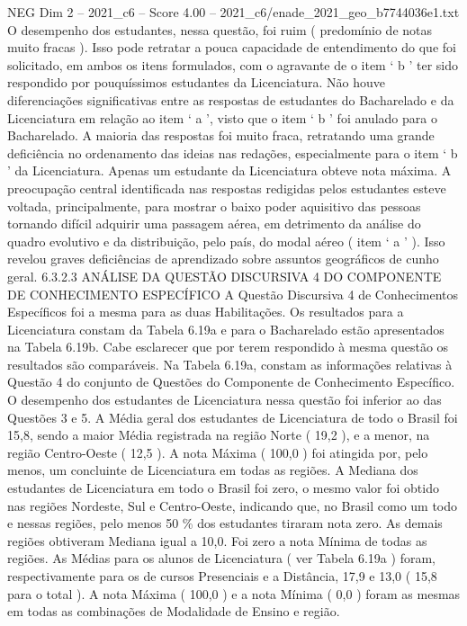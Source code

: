 \begin{textsample}{NEG Dim 2 – 2021\_c6 – Score 4.00 – 2021\_c6/enade\_2021\_geo\_b7744036e1.txt}
O desempenho dos estudantes, nessa questão, foi ruim ( predomínio de notas muito fracas ).
Isso pode retratar a pouca capacidade de entendimento do que foi solicitado, em ambos os itens formulados, com o agravante de o item ‘ b ’ ter sido respondido por pouquíssimos estudantes da Licenciatura.
Não houve diferenciações significativas entre as respostas de estudantes do Bacharelado e da Licenciatura em relação ao item ‘ a ’, visto que o item ‘ b ’ foi anulado para o Bacharelado.
A maioria das respostas foi muito fraca, retratando uma grande deficiência no ordenamento das ideias nas redações, especialmente para o item ‘ b ’ da Licenciatura.
Apenas um estudante da Licenciatura obteve nota máxima.
A preocupação central identificada nas respostas redigidas pelos estudantes esteve voltada, principalmente, para mostrar o baixo poder aquisitivo das pessoas tornando difícil adquirir uma passagem aérea, em detrimento da análise do quadro evolutivo e da distribuição, pelo país, do modal aéreo ( item ‘ a ’ ).
Isso revelou graves deficiências de aprendizado sobre assuntos geográficos de cunho geral. 6.3.2.3 ANÁLISE DA QUESTÃO DISCURSIVA 4 DO COMPONENTE DE CONHECIMENTO ESPECÍFICO A Questão Discursiva 4 de Conhecimentos Específicos foi a mesma para as duas Habilitações.
Os resultados para a Licenciatura constam da Tabela 6.19a e para o Bacharelado estão apresentados na Tabela 6.19b.
Cabe esclarecer que por terem respondido à mesma questão os resultados são comparáveis.
Na Tabela 6.19a, constam as informações relativas à Questão 4 do conjunto de Questões do Componente de Conhecimento Específico.
O desempenho dos estudantes de Licenciatura nessa questão foi inferior ao das Questões 3 e 5.
A Média geral dos estudantes de Licenciatura de todo o Brasil foi 15,8, sendo a maior Média registrada na região Norte ( 19,2 ), e a menor, na região Centro-Oeste ( 12,5 ).
A nota Máxima ( 100,0 ) foi atingida por, pelo menos, um concluinte de Licenciatura em todas as regiões.
A Mediana dos estudantes de Licenciatura em todo o Brasil foi zero, o mesmo valor foi obtido nas regiões Nordeste, Sul e Centro-Oeste, indicando que, no Brasil como um todo e nessas regiões, pelo menos 50 \% dos estudantes tiraram nota zero.
As demais regiões obtiveram Mediana igual a 10,0.
Foi zero a nota Mínima de todas as regiões.
As Médias para os alunos de Licenciatura ( ver Tabela 6.19a ) foram, respectivamente para os de cursos Presenciais e a Distância, 17,9 e 13,0 ( 15,8 para o total ).
A nota Máxima ( 100,0 ) e a nota Mínima ( 0,0 ) foram as mesmas em todas as combinações de Modalidade de Ensino e região.

\end{textsample}

